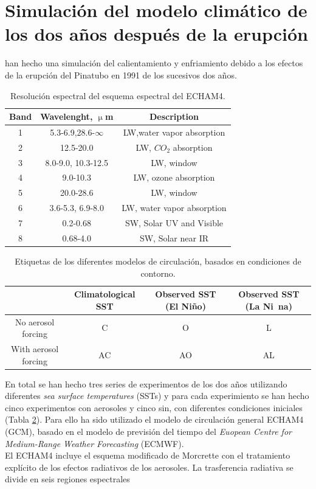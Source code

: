 \documentclass[a4apaper,twocolumn,10pt]{article}
\begin{document}
\section{Simulaci\'on del modelo clim\'atico de los dos a\~nos despu\'es de la erupci\'on}
\cite{kirchner1999climate} han hecho una simulaci\'on del calientamiento y enfriamiento debido a los efectos de la erupci\'on del Pinatubo en 1991 de los sucesivos dos a\~nos. 
\begin{table}[b]
\centering
\begin{tabular}{c|c|c}
Band&Wavelenght, $\upmu$m&Description \\ \hline
1&5.3-6.9,28.6-$\infty$&LW,water vapor absorption \\
2&12.5-20.0&LW, $CO_{2}$ absorption\\
3&8.0-9.0, 10.3-12.5&LW, window \\
4&9.0-10.3&LW, ozone absorption \\
5&20.0-28.6&LW, window \\
6&3.6-5.3, 6.9-8.0&LW, water vapor absorption \\
7&0.2-0.68&SW, Solar UV and Visible \\
8&0.68-4.0&SW, Solar near IR \\ \hline
\end{tabular}
\caption{Resoluci\'on espectral del esquema espectral del ECHAM4.} \label{tlb:Tabla1}
\end{table}
\begin{table}[t]
\centering
\begin{tabular}{c|c|c|c}
&Climatological SST&Observed SST (El Ni\~no)&Observed SST (La Ni~na) \\ \hline
No aerosol forcing&C&O&L\\
With aerosol forcing&AC&AO&AL\\ \hline
\end{tabular}
\caption{Etiquetas de los diferentes modelos de circulaci\'on, basados en condiciones de contorno.} \label{tlb:Tabla2}
\end{table}
En total se han hecho tres series de experimentos de los dos a\~nos utilizando diferentes \textit{sea surface temperatures} (SSTs) y para cada experimiento se han hecho cinco experimentos con aerosoles y cinco sin, con diferentes condiciones iniciales (Tabla \ref{tlb:Tabla2}).
Para ello ha sido utilizado el modelo de circulaci\'on general ECHAM4 (GCM), basado en el modelo de previsi\'on del tiempo del \textit{Euopean Centre for Medium-Range Weather Forecasting} (ECMWF). \\El ECHAM4 incluye el esquema modificado de Morcrette con el tratamiento expl\'icito de los efectos radiativos de los aerosoles. La trasferencia radiativa se divide en seis regiones espectrales 
\end{document}
